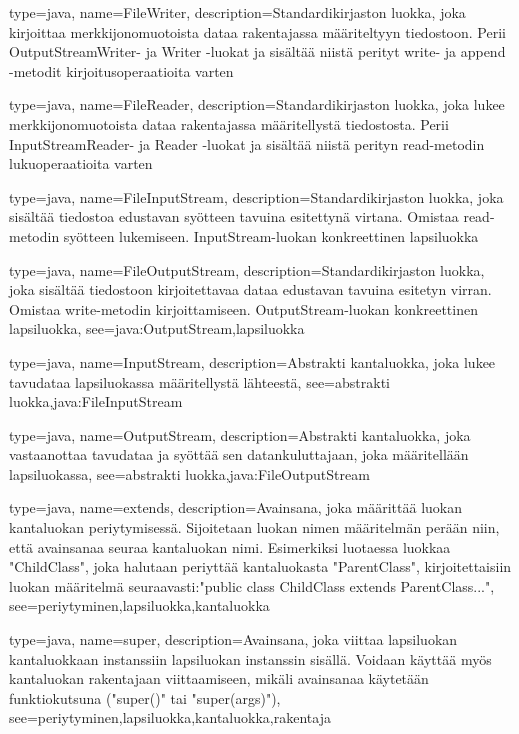 {
	type=java,
	name=FileWriter,
	description={Standardikirjaston luokka, joka kirjoittaa merkkijonomuotoista dataa rakentajassa
määriteltyyn tiedostoon. Perii OutputStreamWriter- ja Writer -luokat ja sisältää niistä perityt
write- ja append -metodit kirjoitusoperaatioita varten}
}

{
	type=java,
	name=FileReader,
	description={Standardikirjaston luokka, joka lukee merkkijonomuotoista dataa rakentajassa
määritellystä tiedostosta. Perii InputStreamReader- ja Reader -luokat ja sisältää niistä perityn
read-metodin lukuoperaatioita varten}
}

{
	type=java,
	name=FileInputStream,
	description={Standardikirjaston luokka, joka sisältää tiedostoa edustavan syötteen tavuina
esitettynä virtana. Omistaa read-metodin syötteen lukemiseen. InputStream-luokan konkreettinen
lapsiluokka}
}

{
	type=java,
	name=FileOutputStream,
	description={Standardikirjaston luokka, joka sisältää tiedostoon kirjoitettavaa dataa
edustavan tavuina esitetyn virran. Omistaa write-metodin kirjoittamiseen. OutputStream-luokan
konkreettinen lapsiluokka},
	see={java:OutputStream,lapsiluokka}
}

{
	type=java,
	name=InputStream,
	description={Abstrakti kantaluokka, joka lukee tavudataa lapsiluokassa määritellystä
lähteestä},
	see={abstrakti luokka,java:FileInputStream}
}

{
	type=java,
	name=OutputStream,
	description={Abstrakti kantaluokka, joka vastaanottaa tavudataa ja syöttää sen	
datankuluttajaan, joka määritellään lapsiluokassa},
	see={abstrakti luokka,java:FileOutputStream}
}

{
	type=java,
	name=extends,
	description={Avainsana, joka määrittää luokan kantaluokan periytymisessä. Sijoitetaan luokan
nimen määritelmän perään niin, että avainsanaa seuraa kantaluokan nimi. Esimerkiksi luotaessa
luokkaa "ChildClass", joka halutaan periyttää kantaluokasta "ParentClass", kirjoitettaisiin luokan
määritelmä seuraavasti:\newline{}"public class ChildClass extends ParentClass..."},
	see={periytyminen,lapsiluokka,kantaluokka}
}

{
	type=java,
	name=super,
	description={Avainsana, joka viittaa lapsiluokan kantaluokkaan instanssiin lapsiluokan
instanssin sisällä. Voidaan käyttää myös kantaluokan rakentajaan viittaamiseen, mikäli
avainsanaa käytetään funktiokutsuna ("super()" tai "super(args)")},
	see={periytyminen,lapsiluokka,kantaluokka,rakentaja}
}

